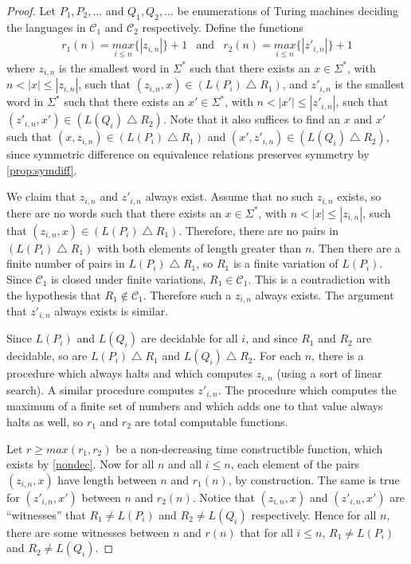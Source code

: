 \documentclass{article}
\theoremstyle{definition} \newtheorem{definition}[definition]{Definition}
\newcommand{\symdiff}{\bigtriangleup} %
\newcommand{\pair}[2]{\langle#1,#2\rangle} %
\begin{document}
\begin{proof} %
  Let $P_1, P_2, \ldots$ and $Q_1, Q_2, \ldots$ be enumerations of Turing
  machines deciding the languages in $\mathcal{C}_1$ and $\mathcal{C}_2$
  respectively. Define the functions
  \begin{eqnarray*}
    r_1(n)=\underset{i\leq n}{max}\{|z_{i,n}|\}+1 & \text{and} &
    r_2(n)=\underset{i\leq n}{max}\{|z'_{i,n}|\}+1
  \end{eqnarray*}
  where $z_{i,n}$ is the smallest word in $\Sigma^*$ such that there exists an
  $x\in\Sigma^*$, with $n<|x|\leq|z_{i,n}|$, such that $(z_{i,n},
  x)\in(L(P_i)\symdiff R_1)$, and $z'_{i,n}$ is the smallest word in $\Sigma^*$
  such that there exists an $x'\in\Sigma^*$, with $n<|x'|\leq|z'_{i,n}|$, such
  that $(z'_{i,n}, x')\in(L(Q_i)\symdiff R_2)$. Note that it also suffices to
  find an $x$ and $x'$ such that $(x, z_{i,n})\in(L(P_i)\symdiff R_1)$ and
  $(x', z'_{i,n})\in(L(Q_i)\symdiff R_2)$, since symmetric difference on
  equivalence relations preserves symmetry by \autoref{prop:symdiff}.

  We claim that $z_{i,n}$ and $z'_{i,n}$ always exist. Assume that no such
  $z_{i,n}$ exists, so there are no words such that there exists an
  $x\in\Sigma^*$, with $n<|x|\leq|z_{i,n}|$, such that $(z_{i,n},
  x)\in(L(P_i)\symdiff R_1)$. Therefore, there are no pairs in $(L(P_i)\symdiff
  R_1)$ with both elements of length greater than $n$. Then there are a finite
  number of pairs in $L(P_i)\symdiff R_1$, so $R_1$ is a finite variation of
  $L(P_i)$. Since $\mathcal{C}_1$ is closed under finite variations,
  $R_1\in\mathcal{C}_1$. This is a contradiction with the hypothesis that
  $R_1\notin\mathcal{C}_1$. Therefore such a $z_{i,n}$ always exists. The
  argument that $z'_{i,n}$ always exists is similar.

  Since $L(P_i)$ and $L(Q_i)$ are decidable for all $i$, and since $R_1$ and
  $R_2$ are decidable, so are $L(P_i)\symdiff R_1$ and $L(Q_i)\symdiff
  R_2$. For each $n$, there is a procedure which always halts and which
  computes $z_{i,n}$ (using a sort of linear search). A similar procedure
  computes $z'_{i,n}$. The procedure which computes the maximum of a finite set
  of numbers and which adds one to that value always halts as well, so $r_1$
  and $r_2$ are total computable functions.

  Let $r\ge max(r_1,r_2)$ be a non-decreasing time constructible function,
  which exists by \autoref{nondec}. Now for all $n$ and all $i\leq n$, each
  element of the pairs $(z_{i,n},x)$ have length between $n$ and $r_1(n)$, by
  construction. The same is true for $(z'_{i,n}, x')$ between $n$ and
  $r_2(n)$. Notice that $(z_{i,n}, x)$ and $(z'_{i,n}, x')$ are ``witnesses''
  that $R_1\neq L(P_i)$ and $R_2\neq L(Q_i)$ respectively. Hence for all $n$,
  there are some witnesses between $n$ and $r(n)$ that for all $i\leq n$,
  $R_1\neq L(P_i)$ and $R_2\neq L(Q_i)$.


\end{proof}
\end{document}
